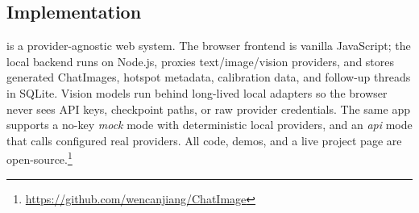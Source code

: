 \subsection{Implementation}
\label{sec:method_implementation}

\method{} is a provider-agnostic web system. The browser frontend is vanilla
JavaScript; the local backend runs on Node.js, proxies text/image/vision
providers, and stores generated ChatImages, hotspot metadata, calibration data,
and follow-up threads in SQLite. Vision models run behind long-lived local
adapters so the browser never sees API keys, checkpoint paths, or raw provider
credentials. The same app supports a no-key \textit{mock} mode with
deterministic local providers, and an \textit{api} mode that calls configured
real providers. All code, demos, and a live project page are
open-source.\footnote{\url{https://github.com/wencanjiang/ChatImage}}
